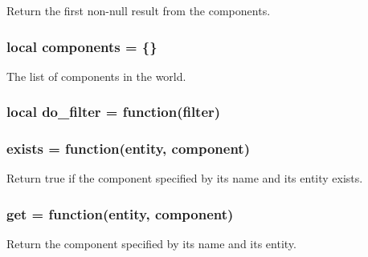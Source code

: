 Return the first non-\/null result from the components. 

\hypertarget{world_8lua_af7702afefbc3cd7e488ba6bc516519d5}{
\subsubsection[{components}]{\setlength{\rightskip}{0pt plus 5cm}local components = \{\}}}\label{world_8lua_af7702afefbc3cd7e488ba6bc516519d5}


The list of components in the world. 

\hypertarget{world_8lua_a1f66d7d4da3c0131a8ef373be509e1ef}{
\subsubsection[{do\-\_\-filter}]{\setlength{\rightskip}{0pt plus 5cm}local do\-\_\-filter = function(filter)}}\label{world_8lua_a1f66d7d4da3c0131a8ef373be509e1ef}
\hypertarget{world_8lua_a6ba751bf71957124ec1fb2c76724448b}{
\subsubsection[{exists}]{\setlength{\rightskip}{0pt plus 5cm}exists = function(entity, component)}}\label{world_8lua_a6ba751bf71957124ec1fb2c76724448b}


Return true if the component specified by its name and its entity exists. 

\hypertarget{world_8lua_a9c57eef25270a48365249a68581a1247}{
\subsubsection[{get}]{\setlength{\rightskip}{0pt plus 5cm}get = function(entity, component)}}\label{world_8lua_a9c57eef25270a48365249a68581a1247}


Return the component specified by its name and its entity. 

